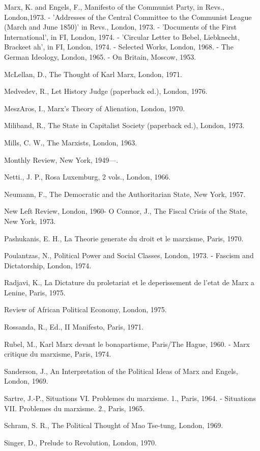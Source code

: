 Marx, K. and Engels, F., Manifesto of the Communist Party, in Revs., London,1973.
- 'Addresses of the Central Committee to the Communist League (March and June 1850)' in Revs., London, 1973.
- 'Documents of the First International', in FI, London, 1974.
- 'Circular Letter to Bebel, Liebknecht, Brackeet ah', in FI, London, 1974.
- Selected Works, London, 1968.
- The German Ideology, London, 1965.
- On Britain, Moscow, 1953.

McLellan, D., The Thought of Karl Marx, London, 1971.

Medvedev, R., Let History Judge (paperback ed.), London, 1976.

MeszAros, I., Marx's Theory of Alienation, London, 1970.

Miliband, R., The State in Capitalist Society (paperback ed.), London, 1973.

Mills, C. W., The Marxists, London, 1963.

Monthly Review, New York, 1949—.

Netti., J. P., Rosa Luxemburg, 2 vols., London, 1966.

Neumann, F., The Democratic and the Authoritarian State, New York, 1957.

New Left Review, London, 1960- O Connor, J., The Fiscal Crisis of the State, New York, 1973.

Pashukanis, E. H., La Theorie generate du droit et le marxisme, Paris, 1970.

Poulantzas, N., Political Power and Social Classes, London, 1973.
- Fascism and Dictatorship, London, 1974.

Radjavi, K., La Dictature du proletariat et le deperissement de l'etat de Marx a Lenine, Paris, 1975.

Review of African Political Economy, London, 1975.

Rossanda, R., Ed., II Manifesto, Paris, 1971.

Rubel, M., Karl Marx devant le bonapartisme, Paris/The Hague, 1960.
- Marx critique du marxisme, Paris, 1974.

Sanderson, J., An Interpretation of the Political Ideas of Marx and Engels, London, 1969.

Sartre, J.-P., Situations VI. Problemes du marxisme. 1., Paris, 1964.
- Situations VII. Problemes du marxisme. 2., Paris, 1965.

Schram, S. R., The Political Thought of Mao Tse-tung, London, 1969.

Singer, D., Prelude to Revolution, London, 1970.

